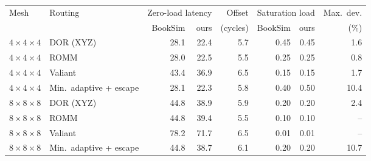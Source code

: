 \begin{tabular}{@{}llrrrrrr@{}}
\toprule
Mesh & Routing & \multicolumn{2}{c}{Zero-load latency} & Offset & \multicolumn{2}{c}{Saturation load} & Max.\ dev. \\
\cmidrule(lr){3-4}\cmidrule(lr){6-7}
 & & BookSim & ours & (cycles) & BookSim & ours & (\%) \\
\midrule
$4\times4\times4$ & DOR (XYZ) & 28.1 & 22.4 & 5.7 & 0.45 & 0.45 & 1.6 \\
$4\times4\times4$ & ROMM & 28.0 & 22.5 & 5.5 & 0.25 & 0.25 & 0.8 \\
$4\times4\times4$ & Valiant & 43.4 & 36.9 & 6.5 & 0.15 & 0.15 & 1.7 \\
$4\times4\times4$ & Min.\ adaptive + escape & 28.1 & 22.3 & 5.8 & 0.40 & 0.50 & 10.4 \\
$8\times8\times8$ & DOR (XYZ) & 44.8 & 38.9 & 5.9 & 0.20 & 0.20 & 2.4 \\
$8\times8\times8$ & ROMM & 44.8 & 39.4 & 5.5 & 0.10 & 0.10 & -- \\
$8\times8\times8$ & Valiant & 78.2 & 71.7 & 6.5 & 0.01 & 0.01 & -- \\
$8\times8\times8$ & Min.\ adaptive + escape & 44.8 & 38.7 & 6.1 & 0.20 & 0.20 & 10.7 \\
\bottomrule
\end{tabular}
